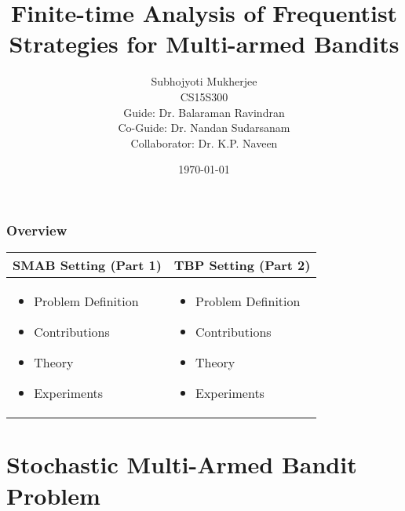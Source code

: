 \documentclass{beamer}
\title[Finite-time Analysis of Frequentist Strategies for Multi-armed Bandits]{Finite-time Analysis of Frequentist Strategies for Multi-armed Bandits} %
\author{Subhojyoti Mukherjee \\ CS15S300 \\ Guide: Dr. Balaraman Ravindran \\ Co-Guide: Dr. Nandan Sudarsanam \\  Collaborator: Dr. K.P. Naveen} %
\institute[IIT Madras] %
{
IIT Madras \\ %
\medskip
}
\date{\today} %
\begin{document}
\nocite{*}
\begin{frame}
\titlepage %
\end{frame}

\begin{frame}
\frametitle{Overview} %
\centering
    \begin{tabular}{|p{5cm}|p{5cm}|}
    \hline
SMAB Setting (Part 1) & TBP Setting (Part 2) \\
\hline
    \begin{itemize}
    \item Problem Definition
    \item Contributions
    \item Theory
    \item Experiments
    \end{itemize}
    &
    \begin{itemize}
    \item Problem Definition
    \item Contributions
    \item Theory
    \item Experiments
    \end{itemize}
\\\hline
    \end{tabular}
\end{frame}



%

\section{Stochastic Multi-Armed Bandit Problem}

\end{document}
